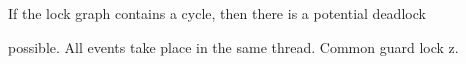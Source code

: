 \documentclass[landscape, a4paper]{article}
\begin{document}
\begin{minipage}[t]{0.195\linewidth}
\begin{betterlist}
		\item If the lock graph contains a cycle, then there is a potential deadlock
		\item {}  possible. All events take place in the same thread. Common guard lock z.
	\end{betterlist}
	\vspace{-0.25cm}


\end{minipage}
\end{document}
